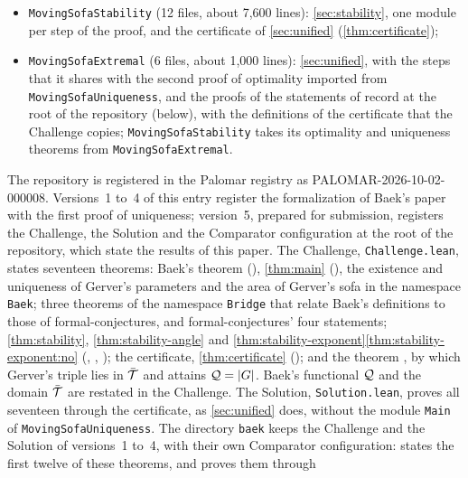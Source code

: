 \begin{itemize}
Gerver's four constants, which the bridge proves; the uniqueness statement,
which it lists as open, follows from \cref{thm:main};
\item \texttt{MovingSofaStability} (12 files, about 7,600 lines):
\cref{sec:stability}, one module per step of the proof, and the certificate of
\cref{sec:unified} (\cref{thm:certificate});
\item \texttt{MovingSofaExtremal} (6 files, about 1,000 lines):
\cref{sec:unified}, with the steps that it shares with the second proof of
optimality imported from \texttt{MovingSofaUniqueness}, and the proofs of the
statements of record at the root of the repository (below), with the
definitions of the certificate that the Challenge copies;
\texttt{MovingSofaStability} takes its optimality and uniqueness theorems from
\texttt{MovingSofaExtremal}.
\end{itemize}
The repository is registered in the Palomar registry as
PALOMAR-2026-10-02-000008. Versions~1 to~4 of this entry register the
formalization of Baek's paper with the first proof of uniqueness; version~5,
prepared for submission, registers the Challenge, the Solution and the
Comparator configuration at the root of the repository, which state the results
of this paper. The Challenge, \texttt{Challenge.lean}, states seventeen theorems: Baek's
theorem (), \cref{thm:main}
(), the existence and uniqueness of Gerver's
parameters and the area of Gerver's sofa in the namespace \texttt{Baek}; three
theorems of the namespace \texttt{Bridge} that relate Baek's definitions to
those of formal-conjectures, and formal-conjectures' four statements;
\cref{thm:stability}, \cref{thm:stability-angle} and
\cref{thm:stability-exponent}\ref{thm:stability-exponent:no}
(, ,
); the certificate,
\cref{thm:certificate} (); and the
theorem , by which Gerver's triple lies in
$\bar{\mathcal{T}}$ and attains $\mathcal{Q}=\lvert G\rvert$. Baek's functional $\mathcal{Q}$ and the domain
$\bar{\mathcal{T}}$ are restated in the Challenge. The Solution, \texttt{Solution.lean},
proves all seventeen through the certificate, as \cref{sec:unified} does,
without the module \texttt{Main} of \texttt{MovingSofaUniqueness}. The
directory \texttt{baek} keeps the Challenge and the Solution of versions~1 to~4,
with their own Comparator configuration:  states the
first twelve of these theorems, and  proves them through
